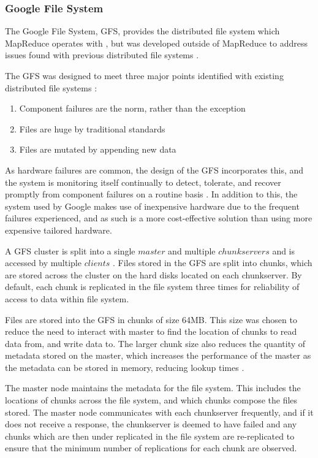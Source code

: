 \subsubsection{Google File System}
The Google File System, GFS, provides the distributed file system which MapReduce operates with \cite{mapreduce}, but was developed outside of MapReduce to address issues found with previous distributed file systems \cite{gfs}.

The GFS was designed to meet three major points identified with existing distributed file systems \cite{gfs}:
\begin{enumerate}
	\item Component failures are the norm, rather than the exception
	\item Files are huge by traditional standards
	\item Files are mutated by appending new data
\end{enumerate}

As hardware failures are common, the design of the GFS incorporates this, and the system is monitoring itself continually to detect, tolerate, and recover promptly from component failures on a routine basis \cite{gfs}. In addition to this, the system used by Google makes use of inexpensive hardware due to the frequent failures experienced, and as such is a more cost-effective solution than using more expensive tailored hardware.

A GFS cluster is split into a single $master$ and multiple $chunkservers$ and is accessed by multiple $clients$ \cite{gfs}. Files stored in the GFS are split into chunks, which are stored across the cluster on the hard disks located on each chunkserver. By default, each chunk is replicated in the file system three times for reliability of access to data within file system.

Files are stored into the GFS in chunks of size 64MB. This size was chosen to reduce the need to interact with master to find the location of chunks to read data from, and write data to. The larger chunk size also reduces the quantity of metadata stored on the master, which increases the performance of the master as the metadata can be stored in memory, reducing lookup times \cite{gfs}.

The master node maintains the metadata for the file system. This includes the locations of chunks across the file system, and which chunks compose the files stored. The master node communicates with each chunkserver frequently, and if it does not receive a response, the chunkserver is deemed to have failed and any chunks which are then under replicated in the file system are re-replicated to ensure that the minimum number of replications for each chunk are observed.

